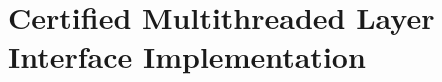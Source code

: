 \section{Certified Multithreaded Layer Interface Implementation}
\label{sec:multithreaded-linking-impl}

%    
%      
%      
%      
%
%      

